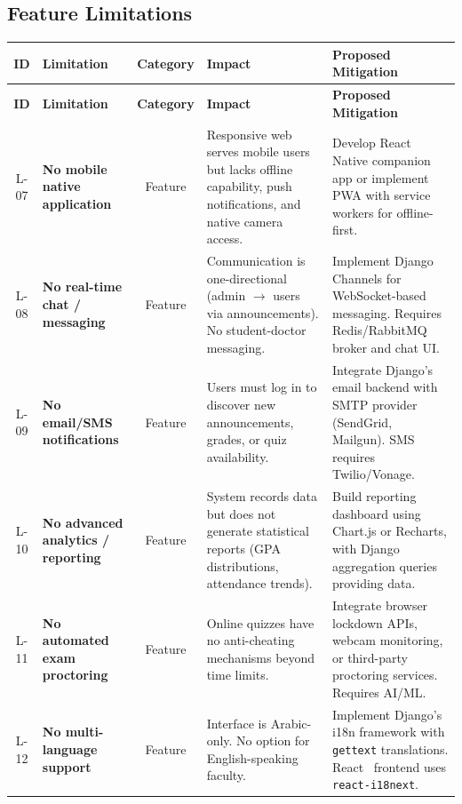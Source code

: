 \newpage
\subsection{Feature Limitations}

\begingroup
\small
\renewcommand{\arraystretch}{1.3}
\begin{longtable}{|c|p{2.5cm}|c|p{3.5cm}|p{4.5cm}|}
    \hline
    \textbf{ID} & \textbf{Limitation} & \textbf{Category} & \textbf{Impact} & \textbf{Proposed Mitigation} \\
    \hline
    \endfirsthead
    \hline
    \textbf{ID} & \textbf{Limitation} & \textbf{Category} & \textbf{Impact} & \textbf{Proposed Mitigation} \\
    \hline
    \endhead
    \hline
    \endfoot
    L-07 & \textbf{No mobile native application} & Feature & Responsive web serves mobile users but lacks offline capability, push notifications, and native camera access. & Develop React Native companion app or implement PWA with service workers for offline-first. \\
    \hline
    L-08 & \textbf{No real-time chat / messaging} & Feature & Communication is one-directional (admin $\rightarrow$ users via announcements). No student-doctor messaging. & Implement Django Channels for WebSocket-based messaging. Requires Redis/RabbitMQ broker and chat UI. \\
    \hline
    L-09 & \textbf{No email/SMS notifications} & Feature & Users must log in to discover new announcements, grades, or quiz availability. & Integrate Django's email backend with SMTP provider (SendGrid, Mailgun). SMS requires Twilio/Vonage. \\
    \hline
    L-10 & \textbf{No advanced analytics / reporting} & Feature & System records data but does not generate statistical reports (GPA distributions, attendance trends). & Build reporting dashboard using Chart.js or Recharts, with Django aggregation queries providing data. \\
    \hline
    L-11 & \textbf{No automated exam proctoring} & Feature & Online quizzes have no anti-cheating mechanisms beyond time limits. & Integrate browser lockdown APIs, webcam monitoring, or third-party proctoring services. Requires AI/ML. \\
    \hline
    L-12 & \textbf{No multi-language support} & Feature & Interface is Arabic-only. No option for English-speaking faculty. & Implement Django's~\cite{django} i18n framework with \texttt{gettext} translations. React~\cite{react} frontend uses \texttt{react-i18next}. \\

\end{longtable}
